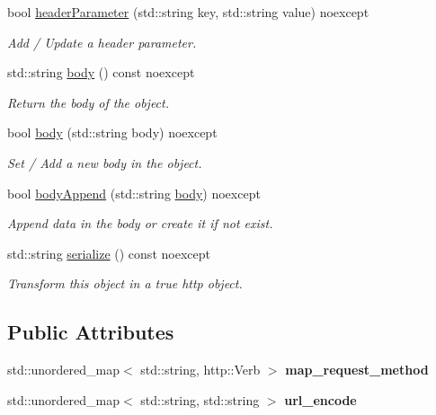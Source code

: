 \begin{DoxyCompactItemize}
bool \hyperlink{classHttpRequest_a04f974104da7c06c568a8e648693e92c}{header\+Parameter} (std\+::string key, std\+::string value) noexcept
\begin{DoxyCompactList}\small\item\em Add / Update a header parameter. \end{DoxyCompactList}\item 
std\+::string \hyperlink{classHttpRequest_a16be46a53c2d2f8d29ad89aa213f30bb}{body} () const noexcept
\begin{DoxyCompactList}\small\item\em Return the body of the object. \end{DoxyCompactList}\item 
bool \hyperlink{classHttpRequest_a591fb5ec9430764ed5b3578d49c3858f}{body} (std\+::string body) noexcept
\begin{DoxyCompactList}\small\item\em Set / Add a new body in the object. \end{DoxyCompactList}\item 
bool \hyperlink{classHttpRequest_afd8f9f22651d2844b7b2d4cb882b7e19}{body\+Append} (std\+::string \hyperlink{classHttpRequest_a16be46a53c2d2f8d29ad89aa213f30bb}{body}) noexcept
\begin{DoxyCompactList}\small\item\em Append data in the body or create it if not exist. \end{DoxyCompactList}\item 
\mbox{\label{classHttpRequest_a3acde34debb29c7e14fc6fd85f9fb49c}} 
std\+::string \hyperlink{classHttpRequest_a3acde34debb29c7e14fc6fd85f9fb49c}{serialize} () const noexcept
\begin{DoxyCompactList}\small\item\em Transform this object in a true http object. \end{DoxyCompactList}\end{DoxyCompactItemize}
\subsection*{Public Attributes}
\begin{DoxyCompactItemize}
\item 
\mbox{\label{classHttpRequest_a95233407ba39db8e17b3d330158ad734}} 
std\+::unordered\+\_\+map$<$ std\+::string, http\+::\+Verb $>$ {\bfseries map\+\_\+request\+\_\+method}
\item 
\mbox{\label{classHttpRequest_aefc311390bef414d9509b27a81dd9578}} 
std\+::unordered\+\_\+map$<$ std\+::string, std\+::string $>$ {\bfseries url\+\_\+encode}
\end{DoxyCompactItemize}


